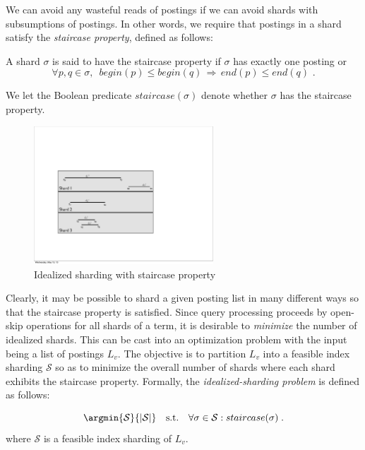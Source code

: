 We can avoid any wasteful reads of postings if we can avoid shards with subsumptions of postings. In other words, we require that postings in a shard satisfy the \emph{staircase property}, defined as follows:  

\begin{definition}
\label{def:staircase}
A shard $\sigma$ is said to have the staircase property if $\sigma$ has exactly one posting or  
$$\forall p,q \in \sigma, \,\,\, begin(p) \leq begin(q) \, \Rightarrow \, end(p) \leq end(q) \,\,.$$ 

We let the Boolean predicate $staircase(\sigma)$ denote whether $\sigma$ has the staircase property.
\end{definition}


\begin{figure}[tb]
	\centering
		\includegraphics[width=0.6\textwidth]{resources/idealized.pdf}
	\caption{Idealized sharding with staircase property}
	 \label{fig:idealized_sharding}
\end{figure}

Clearly, it may be possible to shard a given posting list in many
different ways so that the staircase property is satisfied. Since query 
processing proceeds by open-skip operations for all shards of a term, 
it is desirable to \emph{minimize} the number of idealized shards. This 
can be cast into an optimization problem with the input being a list of postings $L_v$. The objective is to partition $L_v$ into a feasible index sharding $\mathcal{S}$ so as to minimize the overall number of shards where each shard exhibits the staircase property. Formally, the \emph{idealized-sharding problem} is defined as follows:

\begin{definition}
$$
  \argmin{\mathcal{S}}{|\mathcal{S}|}  \quad\mbox{s.t.} \quad \forall \sigma \in \mathcal{S} : staircase(\sigma) \;.
$$ where $\mathcal{S}$ is a feasible index sharding of $L_v$.
	
\end{definition}

